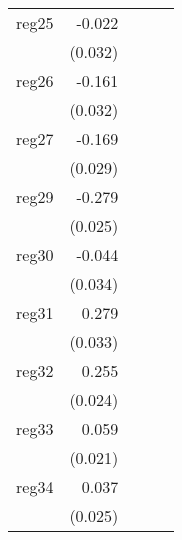 {\begin{longtable}{l*{4}{D{.}{.}{-1}}}
\addlinespace
reg25       &      -0.022         &                     &                     &                     \\
            &     (0.032)         &                     &                     &                     \\
\addlinespace
reg26       &      -0.161\sym{***}&                     &                     &                     \\
            &     (0.032)         &                     &                     &                     \\
\addlinespace
reg27       &      -0.169\sym{***}&                     &                     &                     \\
            &     (0.029)         &                     &                     &                     \\
\addlinespace
reg29       &      -0.279\sym{***}&                     &                     &                     \\
            &     (0.025)         &                     &                     &                     \\
\addlinespace
reg30       &      -0.044         &                     &                     &                     \\
            &     (0.034)         &                     &                     &                     \\
\addlinespace
reg31       &       0.279\sym{***}&                     &                     &                     \\
            &     (0.033)         &                     &                     &                     \\
\addlinespace
reg32       &       0.255\sym{***}&                     &                     &                     \\
            &     (0.024)         &                     &                     &                     \\
\addlinespace
reg33       &       0.059\sym{**} &                     &                     &                     \\
            &     (0.021)         &                     &                     &                     \\
\addlinespace
reg34       &       0.037         &                     &                     &                     \\
            &     (0.025)         &                     &                     &                     \\

\end{longtable}}
